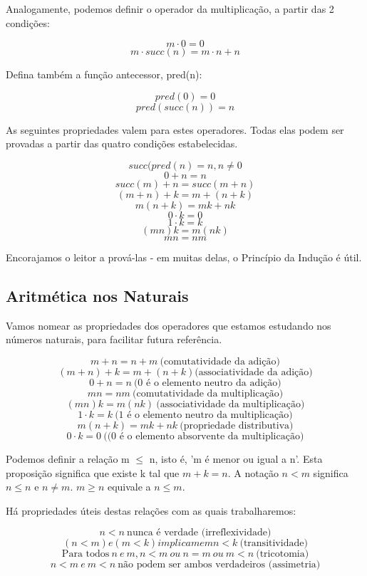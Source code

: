 Analogamente, podemos definir o operador da multiplicação, a partir das 2 condições:
\begin{center}
\[m\cdot0=0\]
\[m\cdot succ(n) = m\cdot n + n\] 
\end{center}

Defina também a função antecessor, pred(n):
\begin{center}
\[pred(0)=0\]
\[pred(succ(n)) = n\] 
\end{center}

As seguintes propriedades valem para estes operadores. Todas elas podem ser provadas a partir das quatro condições estabelecidas. 

\begin{center}
\[succ(pred(n) = n, n \neq 0\]
\[0 + n  = n\]
\[succ(m) + n = succ(m+n)\] 
\[(m+n)+k = m+(n+k)\] 
\[m(n+k)=mk+nk\] 
\[0\cdot k = 0\] 
\[1\cdot k = k\] 
\[(mn)k = m(nk)\] 
\[mn = nm\] 
\end{center}
Encorajamos o leitor a prová-las - em muitas delas, o Princípio da Indução é útil.


\subsection{Aritmética nos Naturais}

Vamos nomear as propriedades dos operadores que estamos estudando nos números naturais, para facilitar futura referência.
\begin{center}
\[m+n=n+m \ \textrm{(comutatividade da adição)}\]
\[(m+n)+k = m+(n+k) \textrm{(associatividade da adição)}\] 
\[0 + n  = n \ \textrm{(0 é o elemento neutro da adição)}\]
\[mn = nm \ \textrm{(comutatividade da multiplicação)}\] 
\[(mn)k = m(nk)\ \textrm{(associatividade da multiplicação)}\] 
\[1\cdot k = k \ \textrm{(1 é o elemento neutro da multiplicação)}\] 
\[m(n+k)=mk+nk\ \textrm{(propriedade distributiva)}\] 
\[0\cdot k = 0\ \textrm{((0 é o elemento absorvente da multiplicação)}\] 
\end{center}
Podemos definir a relação m $\leq$ n, isto é, 'm é menor ou igual a n'. Esta proposição significa que existe k tal que $m+k=n$. A notação $n < m$ significa $n \leq n$ e $n \neq m$. $m \geq n$ equivale a $n \leq m$.

Há propriedades úteis destas relações com as quais trabalharemos:
\begin{center}
\[n < n \ \textrm{nunca é verdade (irreflexividade)}\]
\[(n<m) e (m<k) implicam em n < k \ \textrm{(transitividade)}\] 
\[\textrm{Para todos} \ n \ e \ m, n < m \ ou \ n = m \ ou \ m < n \ \textrm{(tricotomia)}\]
\[n < m \ e \ m < n  \ \textrm{não podem ser ambos verdadeiros (assimetria)}\] 
\end{center}

